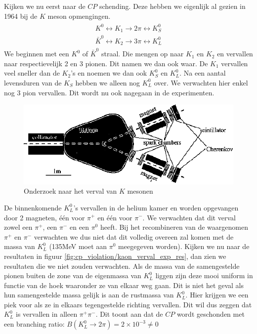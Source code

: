 \documentclass[../main.tex]{subfiles}
\begin{document}
Kijken we nu eerst naar de $CP$ schending. Deze hebben we eigenlijk al gezien in 1964 bij de $K$ meson opmengingen.
\begin{equation}
    \begin{aligned}
        \label{eq:k_mes_osc}
        \begin{array}{l}
            K^{0} \leftrightarrow K_{1} \rightarrow 2 \pi \leftrightarrow K_{S}^{0} \\
            \bar{K}^{0} \leftrightarrow K_{2} \rightarrow 3 \pi \leftrightarrow K_{L}^{0}
        \end{array}
    \end{aligned}
\end{equation}
We beginnen met een $K^0$ of $\bar{K}^0$ straal. Die mengen op naar $K_1$ en $K_2$ en vervallen naar respectievelijk 2 en 3 pionen. Dit namen we dan ook waar. De $K_1$ vervallen veel sneller dan de $K_2$'s en noemen we dan ook $K_S^0$ en $K_L^0$. Na een aantal levensduren van de $K_S$ hebben we alleen nog $K_L^0$ over. We verwachten hier enkel nog 3 pion vervallen. Dit wordt nu ook nagegaan in de experimenten.

\begin{figure}[h]
    \centering
    \includegraphics[width=0.7\linewidth]{cp_violation/kaon_verval_exp.png}
    \caption{Onderzoek naar het verval van $K$ mesonen}%
    \label{fig:cp_violation/kaon_verval_exp}
\end{figure}

De binnenkomende $K_L^0$'s vervallen in de helium kamer en worden opgevangen door 2 magneten, één voor $\pi^+$ en één voor $\pi^-$. We verwachten dat dit verval zowel een $\pi^+$, een $\pi^-$ en een $\pi^0$ heeft. Bij het recombineren van de waargenomen $\pi^+$ en $\pi^-$ verwachten we dus niet dat dit volledig overeen zal komen met de massa van $K_L^0$ (135MeV moet aan $\pi^0$ meegegeven worden). Kijken we nu naar de resultaten in figuur \ref{fig:cp_violation/kaon_verval_exp_res}, dan zien we resultaten die we niet zouden verwachten. Als de massa van de samengestelde pionen buiten de zone van de eigenmassa van $K_L^0$ liggen zijn deze mooi uniform in functie van de hoek waaronder ze van elkaar weg gaan. Dit is niet het geval als hun samengestelde massa gelijk is aan de rustmassa van $K_L^0$. Hier krijgen we een piek voor als ze in elkaars tegengestelde richting vervallen. Dit wil dus zeggen dat $K_L^0$ is vervallen in alleen $\pi^+\pi^-$. Dit toont aan dat de $CP$ wordt geschonden met een branching ratio: $B\left(K_{L}^{0} \rightarrow 2 \pi\right)=2 \times 10^{-3} \neq 0$
\end{document}
